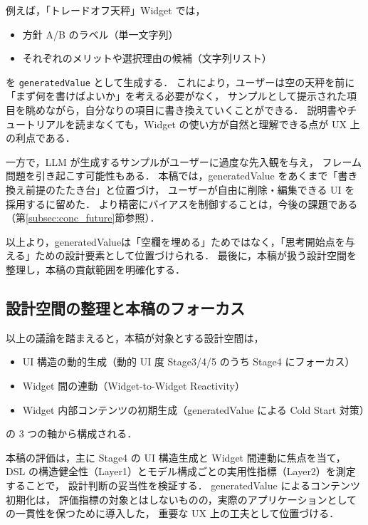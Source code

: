 \documentclass[a4paper,10pt]{jarticle}
\begin{document}
例えば，「トレードオフ天秤」Widget では，
\begin{itemize}
  \item 方針 A/B のラベル（単一文字列）
  \item それぞれのメリットや選択理由の候補（文字列リスト）
\end{itemize}
を \texttt{generatedValue} として生成する．
これにより，ユーザーは空の天秤を前に「まず何を書けばよいか」を考える必要がなく，
サンプルとして提示された項目を眺めながら，自分なりの項目に書き換えていくことができる．
説明書やチュートリアルを読まなくても，Widget の使い方が自然と理解できる点が UX 上の利点である．

一方で，LLM が生成するサンプルがユーザーに過度な先入観を与え，
フレーム問題を引き起こす可能性もある．
本稿では，generatedValue をあくまで「書き換え前提のたたき台」と位置づけ，
ユーザーが自由に削除・編集できる UI を採用するに留めた．
より精密にバイアスを制御することは，今後の課題である（第\ref{subsec:conc_future}節参照）．

以上より，generatedValueは「空欄を埋める」ためではなく，「思考開始点を与える」ための設計要素として位置づけられる． 最後に，本稿が扱う設計空間を整理し，本稿の貢献範囲を明確化する．

\subsection{設計空間の整理と本稿のフォーカス}
\label{subsec:design_space}

以上の議論を踏まえると，本稿が対象とする設計空間は，
\begin{itemize}
  \item UI 構造の動的生成（動的 UI 度 Stage3/4/5 のうち Stage4 にフォーカス）
  \item Widget 間の連動（Widget-to-Widget Reactivity）
  \item Widget 内部コンテンツの初期生成（generatedValue による Cold Start 対策）
\end{itemize}
の 3 つの軸から構成される．

本稿の評価は，主に Stage4 の UI 構造生成と Widget 間連動に焦点を当て，
DSL の構造健全性（Layer1）とモデル構成ごとの実用性指標（Layer2）を測定することで，
設計判断の妥当性を検証する．
generatedValue によるコンテンツ初期化は，
評価指標の対象とはしないものの，実際のアプリケーションとしての一貫性を保つために導入した，
重要な UX 上の工夫として位置づける．


\end{document}

